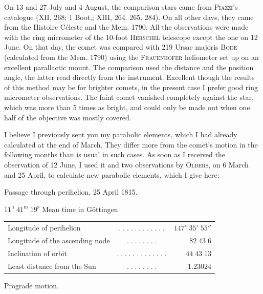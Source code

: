 \par\indent On 13 and 27 July and 4 August, the comparison stars came from \textsc{Piazzi}’s catalogue (XII, 268; 1 Boot.; XIII, 264. 265. 284). On all other days, they came from the Histoire Céleste and the Mem. 1790. All the observations were made with the ring micrometer of the 10-foot \textsc{Herschel} telescope except the one on 12 June. On that day, the comet was compared with 219 Ursae majoris \textsc{Bode} (calculated from the Mem. 1790) using the \textsc{Frauenhofer} heliometer set up on an excellent parallactic mount. The comparison used the distance and the position angle, the latter read directly from the instrument. Excellent though the results of this method may be for brighter comets, in the present case I prefer good ring micrometer observations. The faint comet vanished completely against the star, which was more than 5 times as bright, and could only be made out when one half of the objective was mostly covered.

\par\indent I believe I previously sent you my parabolic elements, which I had already calculated at the end of March. They differ more from the comet’s motion in the following months than is usual in such cases. As soon as I received the observation of 12 June, I used it and two observations by \textsc{Olbers}, on 6 March and 25 April, to calculate new parabolic elements, which I give here:

\begin{center}\fontsize{10}{12}\selectfont Passage through perihelion, 25 April 1815.\par $11^{\mathrm u}\;41^{\mathrm m}\;19^{\mathrm s}$ Mean time in Göttingen\end{center}
\begin{center}\fontsize{9}{11}\selectfont\setlength{\tabcolsep}{2pt}\renewcommand{\arraystretch}{1.15}\begin{tabular}{lcr}
Longitude of perihelion & $.\;.\;.\;.\;.\;.\;.\;.\;.\;.\;.\;.$ & $147^\circ\;35'\;55''$\\
Longitude of the ascending node & $.\;.\;.\;.\;.\;.\;.\;.$ & $82\;43\;6$\\
Inclination of orbit & $.\;.\;.\;.\;.\;.\;.\;.\;.\;.\;.\;.\;.$ & $44\;43\;13$\\
Least distance from the Sun & $.\;.\;.\;.\;.\;.\;.\;.$ & $1.23024$\\
\end{tabular}\end{center}\begin{center}Prograde motion.\end{center}

